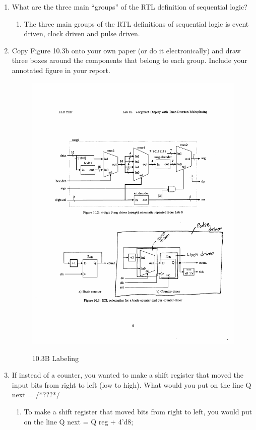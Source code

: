 \documentclass[11pt]{article}
\begin{document}
\begin{enumerate}
		\item What are the three main “groups” of the RTL deﬁnition of sequential logic?
		\begin{enumerate}
			\item 	The three main groups of the RTL definitions of sequential logic is event driven, clock driven and pulse driven. 
		\end{enumerate}
	
	\item Copy Figure 10.3b onto your own paper (or do it electronically) and draw three boxes around the components that belong to each group. Include your annotated ﬁgure in your report.
	
	\begin{figure}[ht]\centering
		\caption{10.3B Labeling}
		\includegraphics[trim={8.8cm 5cm 0cm 14cm},clip]{10.3_b.pdf}
		\label{fig:picture}
	\end{figure}

	\item If instead of a counter, you wanted to make a shift register that moved the input bits from right to left (low to high). What would you put on the line Q next = /*???*/
	\begin{enumerate}
		\item To make a shift register that moved bits from right to left, you would put on the line Q next = Q reg + 4'd8;
	\end{enumerate}
\end{enumerate}
\end{document}
